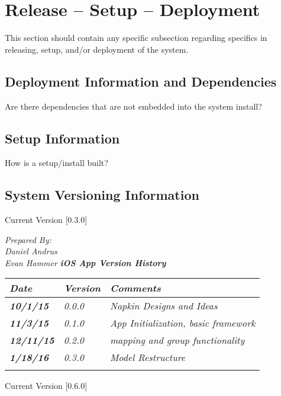 
\chapter{Release -- Setup -- Deployment}
This section should contain any specific subsection regarding specifics in releasing, 
setup, and/or deployment of the system. 


\section{Deployment Information and Dependencies}
Are there dependencies that are not embedded into the system install? 



\section{Setup Information}
How is a setup/install built? 



\section{System  Versioning Information}
Current Version [0.3.0]
\vspace*{5mm}

{\color{SDColor5}
\noindent
\textit{Prepared By:}\\
\textit{Daniel Andrus}\\
\textit{Evan Hammer}
}
\vfill
\noindent
{\color{SDColor3} \textit{\textbf{iOS App Version History}}}\\
\begin{tabular}{|>{\raggedright}p{1.5cm}|>{\raggedright}p{1.5cm}|>{\raggedright}p{9cm}|}
\hline
\textit{\textbf{Date}} &  \textit{\textbf{Version}} & \textit{\textbf{Comments}}\tabularnewline
\hline
 \textit{\textbf{10/1/15}} & \textit{0.0.0} & \textit{Napkin Designs and Ideas}\tabularnewline
 \hline
  \textit{\textbf{11/3/15}} & \textit{0.1.0} & \textit{App Initialization, basic framework}\tabularnewline
 \hline
 \textit{\textbf{12/11/15}} & \textit{0.2.0} & \textit{mapping and group functionality}\tabularnewline
\hline
 \textit{\textbf{1/18/16}} & \textit{0.3.0} & \textit{Model Restructure}\tabularnewline
 &  & \tabularnewline
\hline
\end{tabular}
\vfill


Current Version [0.6.0]
\vspace*{5mm}

